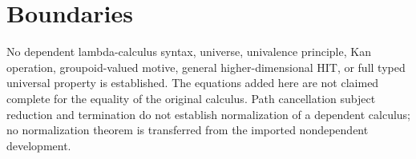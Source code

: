 \documentclass[11pt,a4paper]{article}
\begin{document}
\section{Boundaries}
No dependent lambda-calculus syntax, universe, univalence principle, Kan
operation, groupoid-valued motive, general higher-dimensional HIT, or full
typed universal property is established. The equations added here are not
claimed complete for the equality of the original calculus. Path cancellation
subject reduction and termination do not establish normalization of a
dependent calculus; no normalization theorem is transferred from the imported
nondependent development.

\tableofcontents



\end{document}
